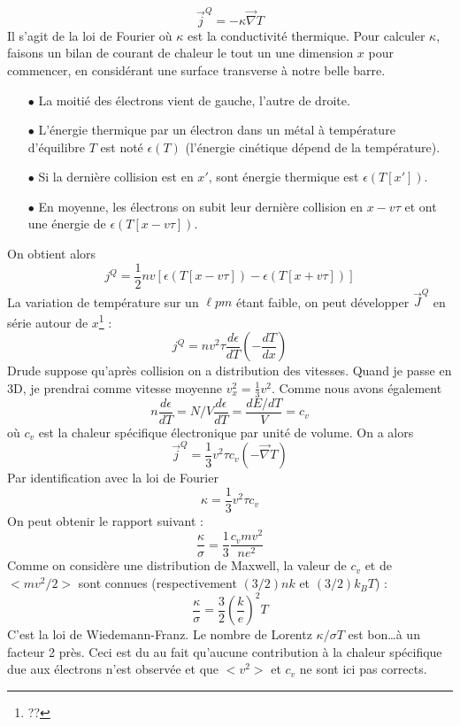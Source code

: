 \begin{equation}
	\vec{j}^Q = -\kappa\vec\nabla T
\end{equation}
Il s'agit de la loi de Fourier où $\kappa$ est la conductivité thermique. 
Pour calculer $\kappa$, faisons un bilan de courant de chaleur le tout 
un une dimension $x$ pour commencer, en considérant une surface transverse 
à notre belle barre.
\begin{itemize}
	\item[$\bullet$] La moitié des électrons vient de gauche, l'autre de droite.
	\item[$\bullet$] L'énergie thermique par un électron dans un métal à 
	      température d'équilibre $T$ est noté $\epsilon(T)$ (l'énergie cinétique 
	      dépend de la température).
	\item[$\bullet$] Si la dernière collision est en $x'$, sont énergie thermique 
	      est $\epsilon(T[x'])$.
	\item[$\bullet$] En moyenne, les électrons on subit leur dernière collision 
	      en $x - v\tau$ et ont une énergie de $\epsilon(T[x-v\tau])$.
\end{itemize}
On obtient alors
\begin{equation}
	j^Q = \frac{1}{2}nv[\epsilon(T[x-v\tau]) - \epsilon(T[x+v\tau])]
\end{equation}
La variation de température sur un $\ell pm$ étant faible, on peut développer 
$\vec{J}^Q$ en série autour de $x$\footnote{??} :
\begin{equation}
	j^Q = nv^2\tau\frac{d\epsilon}{dT}\left(-\dfrac{dT}{dx}\right)
\end{equation}
Drude suppose qu'après collision on a distribution des vitesses. Quand 
je passe en 3D, je prendrai comme vitesse moyenne $v_x^2 = \frac{1}{3}v^2$. 
Comme nous avons également
\begin{equation}
	n\frac{d\epsilon}{dT} = N/V\frac{d\epsilon}{dT} = \frac{dE/dT}{V} = c_v
\end{equation} 
où $c_v$ est la chaleur spécifique électronique par unité de volume. On 
a alors
\begin{equation}
	\vec{j}^Q = \frac{1}{3}v^2\tau c_v(-\vec{\nabla}T)
\end{equation}
Par identification avec la loi de Fourier 
\begin{equation}
	\kappa = \frac{1}{3}v^2 \tau c_v
\end{equation}
On peut obtenir le rapport suivant :
\begin{equation}
	\frac{\kappa}{\sigma} = \frac{1}{3}\frac{c_vmv^2}{ne^2}
\end{equation}
Comme on considère une distribution de Maxwell, la valeur de $c_v$ 
et de $<mv^2/2>$ sont connues (respectivement $(3/2)nk$ et $(3/2)k_BT$) :
\begin{equation}
	\frac{\kappa}{\sigma} = \frac{3}{2}\left(\frac{k}{e}\right)^2 T
\end{equation}
C'est la loi de Wiedemann-Franz. Le nombre de Lorentz $\kappa/\sigma T$ 
est bon\dots à un facteur 2 près. Ceci est du au fait qu'aucune 
contribution à la chaleur spécifique due aux électrons n'est observée et 
que $<v^2>$ et $c_v$ ne sont ici pas corrects.

